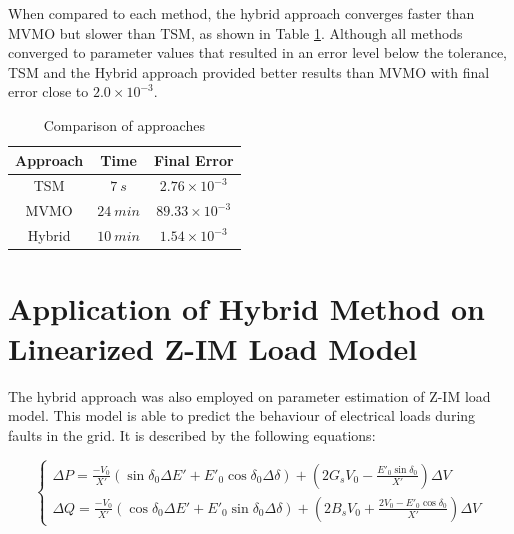 When compared to each method, the hybrid approach converges faster than MVMO but slower than TSM, as shown in Table \ref{tab: SM}. Although all methods converged to parameter values that resulted in an error level below the tolerance, TSM and the Hybrid approach provided better results than MVMO with final error close to $2.0\times 10^{-3}$.

\begin{table}[h]
	\caption{Comparison of approaches}
	\begin{center}
	\begin{tabular}{c|c|c}
		Approach & Time & Final Error \\
		\hline
		TSM  & $7 \ s$  & $2.76\times 10^{-3}$ \\
		MVMO  & $24 \ min$  & $89.33\times 10^{-3}$\\
		Hybrid  & $10 \ min$  & $1.54\times 10^{-3}$
	\end{tabular}
	\end{center}
	\label{tab: SM}
\end{table}

\section{Application of Hybrid Method on Linearized Z-IM Load Model}

The hybrid approach was also employed on parameter estimation of Z-IM load model. This model is able to predict the behaviour of electrical loads during faults in the grid. It is described by the following equations:


\begin{equation}
    \begin{cases}
        \Delta P = \frac{-V_{0}}{X'}(\sin{\delta_{0}}\Delta E' + E'_{0}\cos{\delta_{0}}\Delta \delta) + \left(2G_{s} V_{0} - \frac{E'_{0} \sin{\delta_{0}}}{X'}\right)\Delta V \\
        \Delta Q = \frac{-V_{0}}{X'}(\cos{\delta_{0}}\Delta E' + E'_{0}\sin{\delta_{0}}\Delta\delta) + \left(2B_{s} V_{0} + \frac{2V_{0} - E'_{0} \cos{\delta_{0}}}{X'}\right)\Delta V
    \end{cases}
    \label{eq: yZIM}
\end{equation}

